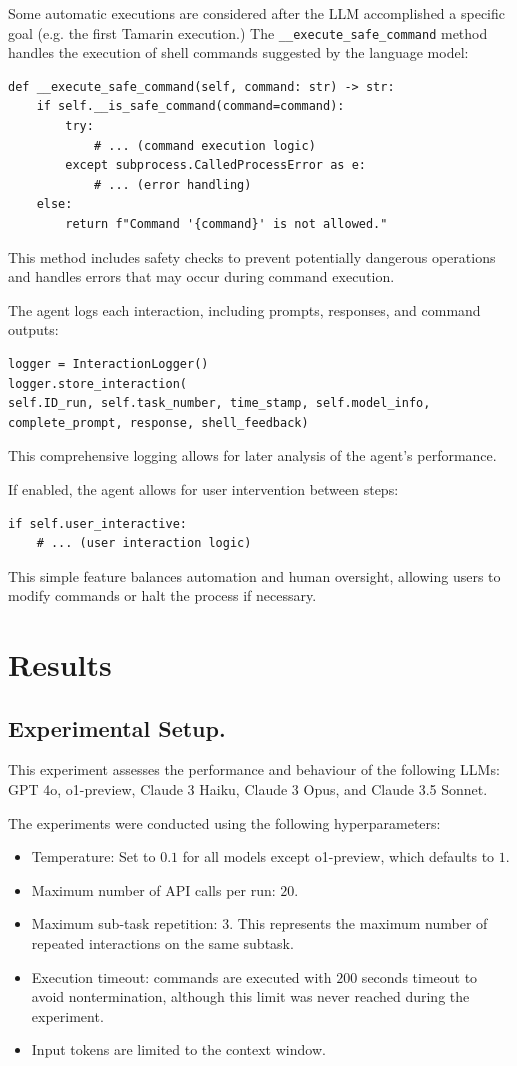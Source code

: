 Some automatic executions are considered after the LLM accomplished a specific goal (e.g. the first Tamarin execution.) The \texttt{\_\_execute\_safe\_command} method handles the execution of shell commands suggested by the language model:
\begin{verbatim}
def __execute_safe_command(self, command: str) -> str:
    if self.__is_safe_command(command=command):
        try:
            # ... (command execution logic)
        except subprocess.CalledProcessError as e:
            # ... (error handling)
    else:
        return f"Command '{command}' is not allowed."
\end{verbatim}

This method includes safety checks to prevent potentially dangerous operations and handles errors that may occur during command execution.

The agent logs each interaction, including prompts, responses, and command outputs:

\begin{verbatim}
logger = InteractionLogger()
logger.store_interaction(
self.ID_run, self.task_number, time_stamp, self.model_info,
complete_prompt, response, shell_feedback)
\end{verbatim}
This comprehensive logging allows for later analysis of the agent's performance.

If enabled, the agent allows for user intervention between steps:
\begin{verbatim}
if self.user_interactive:
    # ... (user interaction logic)
\end{verbatim}
This simple feature balances automation and human oversight, allowing users to modify commands or halt the process if necessary.

\section{Results}
\label{sec:results}

\subsection{Experimental Setup.} This experiment assesses the performance and behaviour of the following LLMs: GPT 4o, o1-preview, Claude 3 Haiku, Claude 3 Opus, and Claude 3.5 Sonnet.

The experiments were conducted using the following hyperparameters: 
\begin{itemize} 
\item Temperature: Set to $0.1$ for all models except o1-preview, which defaults to $1$. 
\item Maximum number of API calls per run: $20$. 
\item Maximum sub-task repetition: $3$. This represents the maximum number of repeated interactions on the same subtask.
\item Execution timeout: commands are executed with $200$ seconds timeout to avoid nontermination, although this limit was never reached during the experiment. 
\item Input tokens are limited to the context window.
\end{itemize}

